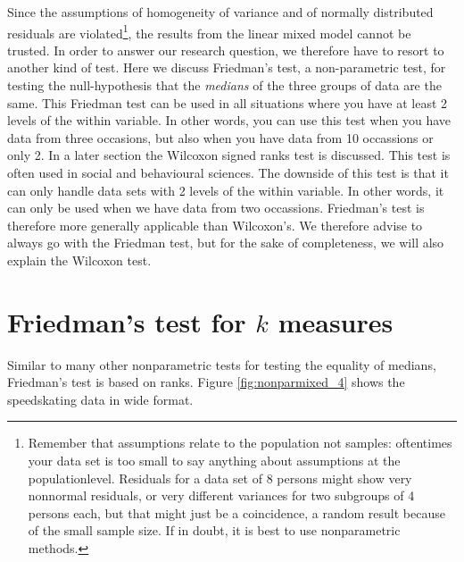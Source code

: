 \begin{knitrout}
\color{fgcolor}\begin{kframe}


{\ttfamily\noindent\bfseries{}}\end{kframe}
\end{knitrout}
Since the assumptions of homogeneity of variance and of normally distributed residuals are violated\footnote{Remember that assumptions relate to the population not samples: oftentimes your data set is too small to say anything about assumptions at the populationlevel. Residuals for a data set of 8 persons might show very nonnormal residuals, or very different variances for two subgroups of 4 persons each, but that might just be a coincidence, a random result because of the small sample size. If in doubt, it is best to use nonparametric methods.}, the results from the linear mixed model cannot be trusted. In order to answer our research question, we therefore have to resort to another kind of test. Here we discuss Friedman's test, a non-parametric test, for testing the null-hypothesis that the \textit{medians} of the three groups of data are the same. This Friedman test can be used in all situations where you have at least 2 levels of the within variable. In other words, you can use this test when you have data from three occasions, but also when you have data from 10 occassions or only 2. In a later section the Wilcoxon signed ranks test is discussed. This test is often used in social and behavioural sciences. The downside of this test is that it can only handle data sets with 2 levels of the within variable. In other words, it can only be used when we have data from two occassions. Friedman's test is therefore more generally applicable than Wilcoxon's. We therefore advise to always go with the Friedman test, but for the sake of completeness, we will also explain the Wilcoxon test.





\section{Friedman's test for $k$ measures}


Similar to many other nonparametric tests for testing the equality of medians, Friedman's test is based on ranks. Figure \ref{fig:nonparmixed_4} shows the speedskating data in wide format.


